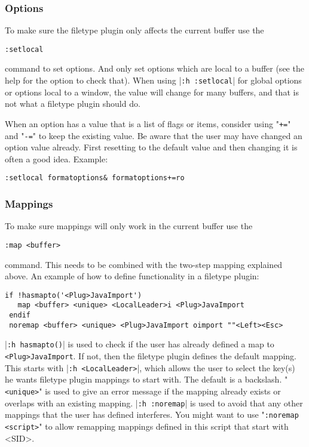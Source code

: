 \subsubsection{Options}
To make sure the filetype plugin only affects the current buffer use the

\begin{Verbatim}[samepage=true]
 :setlocal
\end{Verbatim}

command to set options.
And only set options which are local to a buffer (see the help for the option to check that).
When using |\verb!:h :setlocal!| for global options or options local to a window, the value will change for many buffers, and that is not what a filetype plugin should do.

When an option has a value that is a list of flags or items, consider using "\verb!+=!" and "\verb!-=!" to keep the existing value.
Be aware that the user may have changed an option value already.
First resetting to the default value and then changing it is often a good idea.
Example:

\begin{Verbatim}[samepage=true]
 :setlocal formatoptions& formatoptions+=ro
\end{Verbatim}

\subsubsection{Mappings}
To make sure mappings will only work in the current buffer use the

\begin{Verbatim}[samepage=true]
 :map <buffer>
\end{Verbatim}

command.
This needs to be combined with the two-step mapping explained above.
An example of how to define functionality in a filetype plugin:

\begin{Verbatim}[samepage=true]
 if !hasmapto('<Plug>JavaImport')
   map <buffer> <unique> <LocalLeader>i <Plug>JavaImport
 endif
 noremap <buffer> <unique> <Plug>JavaImport oimport ""<Left><Esc>
\end{Verbatim}

|\verb!:h hasmapto()!| is used to check if the user has already defined a map to \verb!<Plug>JavaImport!.
If not, then the filetype plugin defines the default mapping.
This starts with |\verb!:h <LocalLeader>!|, which allows the user to select the key(s) he wants filetype plugin mappings to start with.
The default is a backslash.
"\verb!<unique>!" is used to give an error message if the mapping already exists or overlaps with an existing mapping.
|\verb!:h :noremap!| is used to avoid that any other mappings that the user has defined interferes.
You might want to use "\verb!:noremap <script>!" to allow remapping mappings defined in this script that start with <SID>.

